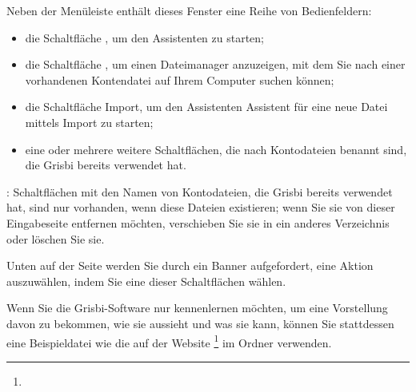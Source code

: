
Neben der Menüleiste enthält dieses Fenster eine Reihe von Bedienfeldern:%

\begin{itemize}
	\item die Schaltfläche , um den Assistenten  zu starten;%
	\item die Schaltfläche , um einen Dateimanager anzuzeigen, mit dem Sie nach einer vorhandenen Kontendatei auf Ihrem Computer suchen können;%
	\item die Schaltfläche {Import}, um den Assistenten {Assistent für eine neue Datei mittels Import} zu starten;%
	\item eine oder mehrere weitere Schaltflächen, die nach Kontodateien benannt sind, die Grisbi bereits verwendet hat.%
\end{itemize}


\Note{}: Schaltflächen mit den Namen von Kontodateien, die Grisbi bereits verwendet hat, sind nur vorhanden, wenn diese Dateien existieren; wenn Sie sie von dieser Eingabeseite entfernen möchten, verschieben Sie sie in ein anderes Verzeichnis oder löschen Sie sie.%


Unten auf der Seite werden Sie durch ein Banner aufgefordert, eine Aktion auszuwählen, indem Sie eine dieser Schaltflächen wählen.%


Wenn Sie die Grisbi-Software nur kennenlernen möchten, um eine Vorstellung davon zu bekommen, wie sie aussieht und was sie kann, können Sie stattdessen eine Beispieldatei wie die auf der Website \footnote{\urlSourceForgeDocumentation{}} im Ordner  verwenden.%

